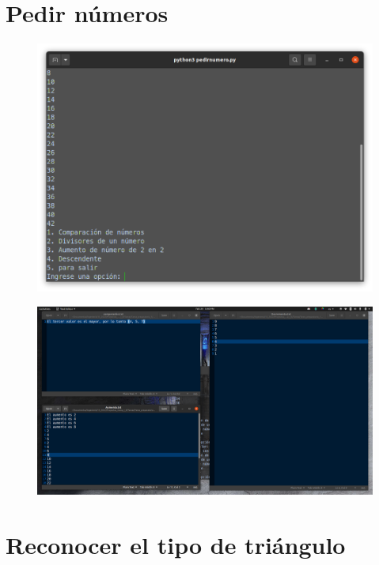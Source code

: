 \documentclass[12pt,letterpaper]{article}
\begin{document}
\begin{multicols}{2}
\section{Pedir números}

\begin{figure}[H]
\centering
\includegraphics[width = \columnwidth]{3-py_pedir_numero.png}
\end{figure}


\begin{figure}[H]
\centering
\includegraphics[width = \columnwidth]{3-txt_pedir_numero.png}
\end{figure}


\section{Reconocer el tipo de triángulo}



\end{multicols}
\end{document}
